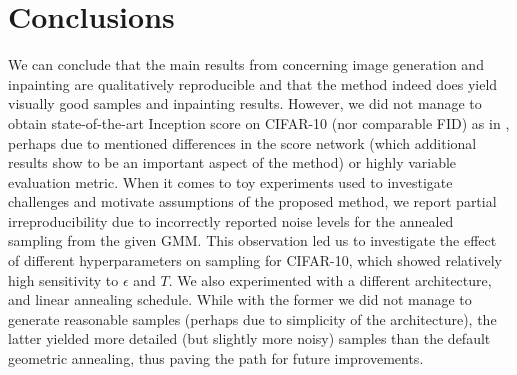 \section{Conclusions}
We can conclude that the main results from \cite{ncsn-paper} concerning image generation and inpainting are qualitatively reproducible and that the method indeed does yield visually good samples and inpainting results. However, we did not manage to obtain state-of-the-art Inception score on CIFAR-10 (nor comparable FID) as in \cite{ncsn-paper}, perhaps due to mentioned differences in the score network (which additional results show to be an important aspect of the method) or highly variable evaluation metric. When it comes to toy experiments used to investigate challenges and motivate assumptions of the proposed method, we report partial irreproducibility due to incorrectly reported noise levels for the annealed sampling from the given GMM. This observation led us to investigate the effect of different hyperparameters on sampling for CIFAR-10, which showed relatively high sensitivity to $\epsilon$ and $T$. We also experimented with a different architecture, and linear annealing schedule. While with the former we did not manage to generate reasonable samples (perhaps due to simplicity of the architecture), the latter yielded more detailed (but slightly more noisy) samples than the default geometric annealing, thus paving the path for future improvements. 

